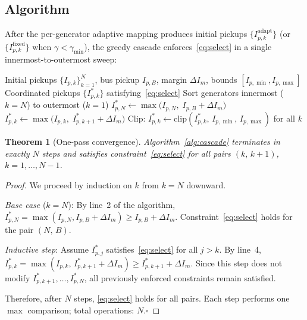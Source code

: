 \documentclass[journal,twoside,10pt]{IEEEtran}
\newtheorem{theorem}{Theorem}
\begin{document}
\subsection{Algorithm}
\label{sec:m4:alg}

After the per-generator adaptive mapping produces initial pickups
$\{I_{p,k}^{\text{adapt}}\}$ (or $\{I_{p,k}^{\text{fixed}}\}$ when
$\gamma < \gamma_{\min}$), the greedy cascade enforces~\eqref{eq:select}
in a single innermost-to-outermost sweep:

\begin{algorithm}[!t]
\caption{Greedy cascade coordination}
\label{alg:cascade}
\begin{algorithmic}[1]
\Require Initial pickups $\{I_{p,k}\}_{k=1}^{N}$, bus pickup $I_{p,B}$,
         margin $\Delta I_m$, bounds $[I_{p,\min}, I_{p,\max}]$
\Ensure Coordinated pickups $\{I_{p,k}^*\}$ satisfying~\eqref{eq:select}
\State Sort generators innermost ($k=N$) to outermost ($k=1$)
\State $I_{p,N}^* \leftarrow
       \max\!\bigl(I_{p,N},\; I_{p,B} + \Delta I_m\bigr)$
  \State $I_{p,k}^* \leftarrow
         \max\!\bigl(I_{p,k},\; I_{p,k+1}^* + \Delta I_m\bigr)$
\EndFor
\State Clip: $I_{p,k}^* \leftarrow
       \mathrm{clip}(I_{p,k}^*,\,I_{p,\min},\,I_{p,\max})$
       for all $k$
\end{algorithmic}
\end{algorithm}

\begin{theorem}[One-pass convergence]
\label{thm:conv}
Algorithm~\ref{alg:cascade} terminates in exactly $N$ steps and satisfies
constraint~\eqref{eq:select} for all pairs $(k,\,k+1)$,
$k = 1,\ldots,N-1$.
\end{theorem}

\begin{proof}
We proceed by induction on $k$ from $k=N$ downward.

\textit{Base case} ($k=N$): By line~2 of the algorithm,
$I_{p,N}^* = \max(I_{p,N}, I_{p,B}+\Delta I_m) \geq I_{p,B}+\Delta I_m$.
Constraint~\eqref{eq:select} holds for the pair $(N,\,B)$.

\textit{Inductive step}: Assume $I_{p,j}^*$ satisfies~\eqref{eq:select}
for all $j > k$.  By line~4, $I_{p,k}^* = \max(I_{p,k},\,
I_{p,k+1}^*+\Delta I_m) \geq I_{p,k+1}^*+\Delta I_m$.
Since this step does not modify $I_{p,k+1}^*,\ldots,I_{p,N}^*$, all
previously enforced constraints remain satisfied.

Therefore, after $N$ steps, \eqref{eq:select} holds for all pairs.
Each step performs one $\max$ comparison; total operations: $N$.$\square$
\end{proof}
\end{document}
